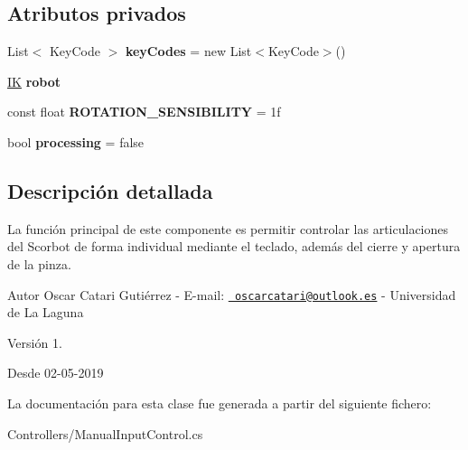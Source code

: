 \subsection*{Atributos privados}
\begin{DoxyCompactItemize}
\item 
\mbox{\label{class_manual_input_control_ac2bddcd756766ed8b4ab9fb4c5a432e9}} 
List$<$ Key\+Code $>$ {\bfseries key\+Codes} = new List$<$Key\+Code$>$()
\item 
\mbox{\label{class_manual_input_control_ad52ab70411ec88c87a534d015cb66479}} 
\mbox{\hyperlink{class_i_k}{IK}} {\bfseries robot}
\item 
\mbox{\label{class_manual_input_control_a7936611cdab48f04f0f46132968cd5e5}} 
const float {\bfseries R\+O\+T\+A\+T\+I\+O\+N\+\_\+\+S\+E\+N\+S\+I\+B\+I\+L\+I\+TY} = 1f
\item 
\mbox{\label{class_manual_input_control_ae2d33a6e78702f6ada4354990f7ebf35}} 
bool {\bfseries processing} = false
\end{DoxyCompactItemize}


\subsection{Descripción detallada}
La función principal de este componente es permitir controlar las articulaciones del Scorbot de forma individual mediante el teclado, además del cierre y apertura de la pinza. \begin{DoxyAuthor}{Autor}
Oscar Catari Gutiérrez -\/ E-\/mail\+: \href{mailto:oscarcatari@outlook.es}{\texttt{ oscarcatari@outlook.\+es}} -\/ Universidad de La Laguna 
\end{DoxyAuthor}
\begin{DoxyVersion}{Versión}
1. 
\end{DoxyVersion}
\begin{DoxySince}{Desde}
02-\/05-\/2019 
\end{DoxySince}


La documentación para esta clase fue generada a partir del siguiente fichero\+:\begin{DoxyCompactItemize}
\item 
Controllers/Manual\+Input\+Control.\+cs\end{DoxyCompactItemize}
